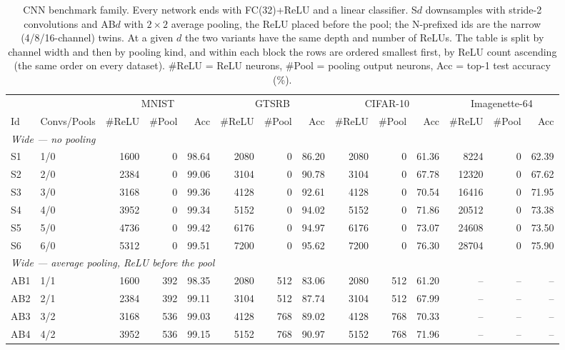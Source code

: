 \begin{table}[t]
\centering
\small
\caption{CNN benchmark family. Every network ends with FC(32)+ReLU and a linear classifier. S$d$ downsamples with stride-2 convolutions and AB$d$ with $2{\times}2$ average pooling, the ReLU placed before the pool; the N-prefixed ids are the narrow (4/8/16-channel) twins. At a given $d$ the two variants have the same depth and number of ReLUs. The table is split by channel width and then by pooling kind, and within each block the rows are ordered smallest first, by ReLU count ascending (the same order on every dataset). \#ReLU = ReLU neurons, \#Pool = pooling output neurons, Acc = top-1 test accuracy (\%).}
\label{tab:cnn-bench}
\begin{tabular}{llrrrrrrrrrrrr}
\toprule
 & & \multicolumn{3}{c}{MNIST} & \multicolumn{3}{c}{GTSRB} & \multicolumn{3}{c}{CIFAR-10} & \multicolumn{3}{c}{Imagenette-64} \\
\cmidrule(lr){3-5} \cmidrule(lr){6-8} \cmidrule(lr){9-11} \cmidrule(lr){12-14}
Id & Convs/Pools & \#ReLU & \#Pool & Acc & \#ReLU & \#Pool & Acc & \#ReLU & \#Pool & Acc & \#ReLU & \#Pool & Acc \\
\midrule
\multicolumn{14}{l}{\textit{Wide --- no pooling}} \\
S1 & 1/0 & 1600 & 0 & 98.64 & 2080 & 0 & 86.20 & 2080 & 0 & 61.36 & 8224 & 0 & 62.39 \\
S2 & 2/0 & 2384 & 0 & 99.06 & 3104 & 0 & 90.78 & 3104 & 0 & 67.78 & 12320 & 0 & 67.62 \\
S3 & 3/0 & 3168 & 0 & 99.36 & 4128 & 0 & 92.61 & 4128 & 0 & 70.54 & 16416 & 0 & 71.95 \\
S4 & 4/0 & 3952 & 0 & 99.34 & 5152 & 0 & 94.02 & 5152 & 0 & 71.86 & 20512 & 0 & 73.38 \\
S5 & 5/0 & 4736 & 0 & 99.42 & 6176 & 0 & 94.97 & 6176 & 0 & 73.07 & 24608 & 0 & 73.50 \\
S6 & 6/0 & 5312 & 0 & 99.51 & 7200 & 0 & 95.62 & 7200 & 0 & 76.30 & 28704 & 0 & 75.90 \\
\midrule
\multicolumn{14}{l}{\textit{Wide --- average pooling, ReLU before the pool}} \\
AB1 & 1/1 & 1600 & 392 & 98.35 & 2080 & 512 & 83.06 & 2080 & 512 & 61.20 & -- & -- & -- \\
AB2 & 2/1 & 2384 & 392 & 99.11 & 3104 & 512 & 87.74 & 3104 & 512 & 67.99 & -- & -- & -- \\
AB3 & 3/2 & 3168 & 536 & 99.03 & 4128 & 768 & 89.02 & 4128 & 768 & 70.33 & -- & -- & -- \\
AB4 & 4/2 & 3952 & 536 & 99.15 & 5152 & 768 & 90.97 & 5152 & 768 & 71.96 & -- & -- & -- \\

\end{tabular}
\end{table}
